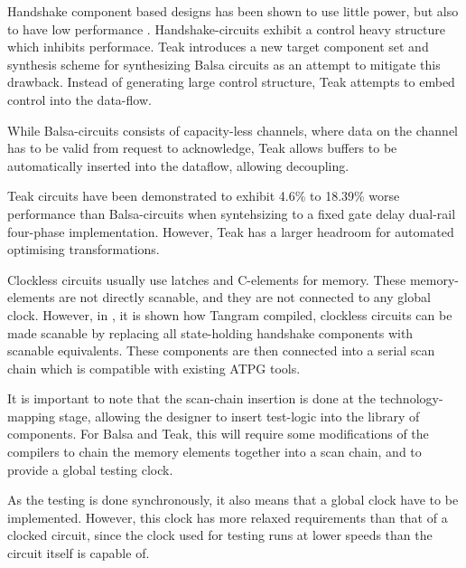Handshake component based designs has been shown to use little power,
but also to have low performance \cite{80c51}. Handshake-circuits
exhibit a control heavy structure which inhibits performace. Teak
\cite{teak} introduces a new target component set and synthesis scheme
for synthesizing Balsa circuits as an attempt to mitigate this
drawback. Instead of generating large control structure, Teak attempts
to embed control into the data-flow.

While Balsa-circuits consists of capacity-less channels, where data on
the channel has to be valid from request to acknowledge, Teak allows
buffers to be automatically inserted into the dataflow, allowing
decoupling. 

Teak circuits have been demonstrated to exhibit 4.6\% to 18.39\% worse
performance than Balsa-circuits when syntehsizing to a fixed gate
delay dual-rail four-phase implementation. However, Teak has a larger
headroom for automated optimising transformations.


Clockless circuits usually use latches and C-elements for
memory. These memory-elements are not directly scanable, and they are
not connected to any global clock. However, in \cite{fullscan}, it is
shown how Tangram compiled, clockless circuits can be made scanable by
replacing all state-holding handshake components with scanable
equivalents. These components are then connected into a serial scan
chain which is compatible with existing ATPG tools.

It is important to note that the scan-chain insertion is done at the
technology-mapping stage, allowing the designer to insert test-logic
into the library of components. For Balsa and Teak, this will require
some modifications of the compilers to chain the memory elements
together into a scan chain, and to provide a global testing clock.

As the testing is done synchronously, it also means that a global
clock have to be implemented. However, this clock has more relaxed
requirements than that of a clocked circuit, since the clock used for
testing runs at lower speeds than the circuit itself is capable of.

